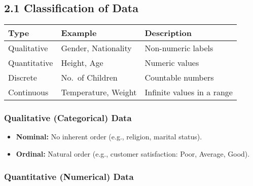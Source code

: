 \documentclass[
  letterpaper,
  DIV=11,
  numbers=noendperiod]{scrreprt}
\providecommand{\tightlist}{%
  \setlength{\itemsep}{0pt}\setlength{\parskip}{0pt}}
\begin{document}
\subsection{2.1 Classification of Data}\label{classification-of-data}

\begin{longtable}[]{@{}
  >{\raggedright\arraybackslash}p{}
  >{\raggedright\arraybackslash}p{}
  >{\raggedright\arraybackslash}p{}@{}}
\toprule\noalign{}
\begin{minipage}[b]{\linewidth}\raggedright
Type
\end{minipage} & \begin{minipage}[b]{\linewidth}\raggedright
Example
\end{minipage} & \begin{minipage}[b]{\linewidth}\raggedright
Description
\end{minipage} \\
\midrule\noalign{}
\endhead
\bottomrule\noalign{}
\endlastfoot
Qualitative & Gender, Nationality & Non-numeric labels \\
Quantitative & Height, Age & Numeric values \\
Discrete & No.~of Children & Countable numbers \\
Continuous & Temperature, Weight & Infinite values in a range \\
\end{longtable}

\subsubsection{Qualitative (Categorical)
Data}\label{qualitative-categorical-data}

\begin{itemize}
\tightlist
\item
  \textbf{Nominal:} No inherent order (e.g., religion, marital status).
\item
  \textbf{Ordinal:} Natural order (e.g., customer satisfaction: Poor,
  Average, Good).
\end{itemize}

\subsubsection{Quantitative (Numerical)
Data}\label{quantitative-numerical-data}
\end{document}
